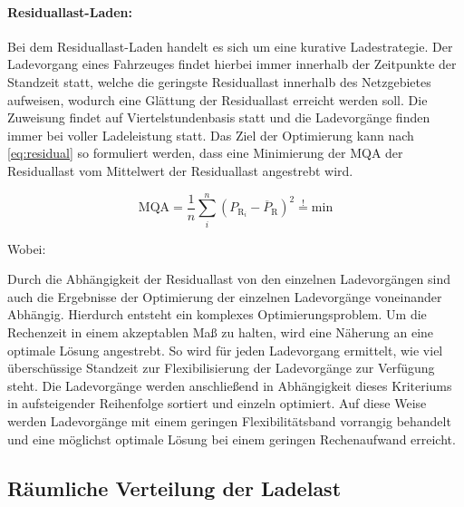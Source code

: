 \paragraph{Residuallast-Laden:}

Bei dem Residuallast-Laden handelt es sich um eine kurative Ladestrategie.
Der Ladevorgang eines Fahrzeuges findet hierbei immer innerhalb der Zeitpunkte der Standzeit statt, welche die geringste Residuallast innerhalb des Netzgebietes aufweisen, wodurch eine Glättung der Residuallast erreicht werden soll.
Die Zuweisung findet auf Viertelstundenbasis statt und die Ladevorgänge finden immer bei voller Ladeleistung statt.
Das Ziel der Optimierung kann nach \autoref{eq:residual} so formuliert werden, dass eine Minimierung der \gls{MQA} der Residuallast vom Mittelwert der Residuallast angestrebt wird.

\begin{equation}
	\text{MQA} = \frac{1}{n} \sum_i^n \left( P_{\text{R}_i} - \overline{P}_{\text{R}} \right)^2 \stackrel{!}{=} \text{min}
	\label{eq:residual}
\end{equation}

\noindent Wobei:


Durch die Abhängigkeit der Residuallast von den einzelnen Ladevorgängen sind auch die Ergebnisse der Optimierung der einzelnen Ladevorgänge voneinander Abhängig.
Hierdurch entsteht ein komplexes Optimierungsproblem.
Um die Rechenzeit in einem akzeptablen Maß zu halten, wird eine Näherung an eine optimale Lösung angestrebt.
So wird für jeden Ladevorgang ermittelt, wie viel überschüssige Standzeit zur Flexibilisierung der Ladevorgänge zur Verfügung steht.
Die Ladevorgänge werden anschließend in Abhängigkeit dieses Kriteriums in aufsteigender Reihenfolge sortiert und einzeln optimiert.
Auf diese Weise werden Ladevorgänge mit einem geringen Flexibilitätsband vorrangig behandelt und eine möglichst optimale Lösung bei einem geringen Rechenaufwand erreicht.


\subsection{Räumliche Verteilung der Ladelast}

